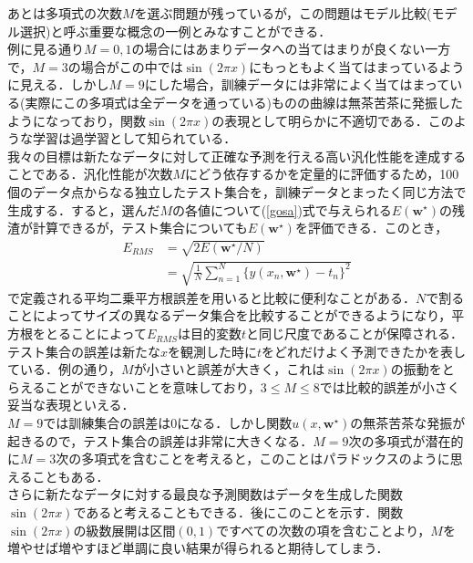 \documentclass{jsarticle}
\theoremstyle{definition}
\numberwithin{equation}{section}
\begin{document}
あとは多項式の次数$M$を選ぶ問題が残っているが，この問題はモデル比較(モデル選択)と呼ぶ重要な概念の一例とみなすことができる．\\

例に見る通り$M=0,1$の場合にはあまりデータへの当てはまりが良くない一方で，$M=3$の場合がこの中では$\sin(2\pi x)$にもっともよく当てはまっているように見える．しかし$M=9$にした場合，訓練データには非常によく当てはまっている(実際にこの多項式は全データを通っている)ものの曲線は無茶苦茶に発振したようになっており，関数$\sin(2\pi x)$の表現として明らかに不適切である．このような学習は過学習として知られている．\\

我々の目標は新たなデータに対して正確な予測を行える高い汎化性能を達成することである．汎化性能が次数$M$にどう依存するかを定量的に評価するため，100個のデータ点からなる独立したテスト集合を，訓練データとまったく同じ方法で生成する．すると，選んだ$M$の各値について(\ref{gosa})式で与えられる$E(\bm w^{\star})$の残渣が計算できるが，テスト集合についても$E(\bm w^{\star})$を評価できる．このとき，
\begin{equation}
\begin{split}
  E_{RMS}&=\sqrt{2E(\bm w^{\star}/N)}\\
          &= \sqrt{\frac{1}{N}\sum_{n=1}^N \{y(x_n,\bm w^{\star}) - t_n\}^2}
\end{split}
\end{equation}
で定義される平均二乗平方根誤差を用いると比較に便利なことがある．$N$で割ることによってサイズの異なるデータ集合を比較することができるようになり，平方根をとることによって$E_{RMS}$は目的変数$t$と同じ尺度であることが保障される．テスト集合の誤差は新たな$x$を観測した時に$t$をどれだけよく予測できたかを表している．例の通り，$M$が小さいと誤差が大きく，これは$\sin(2\pi x)$の振動をとらえることができないことを意味しており，$3\leq M\leq 8$では比較的誤差が小さく妥当な表現といえる．\\

$M=9$では訓練集合の誤差は$0$になる．しかし関数$u(x,\bm w^{\star})$の無茶苦茶な発振が起きるので，テスト集合の誤差は非常に大きくなる．$M=9$次の多項式が潜在的に$M=3$次の多項式を含むことを考えると，このことはパラドックスのように思えることもある．\\
さらに新たなデータに対する最良な予測関数はデータを生成した関数$\sin (2\pi x)$であると考えることもできる．後にこのことを示す．関数$\sin (2\pi x)$の級数展開は区間$(0,1)$ですべての次数の項を含むことより，$M$を増やせば増やすほど単調に良い結果が得られると期待してしまう．\\
\end{document}
